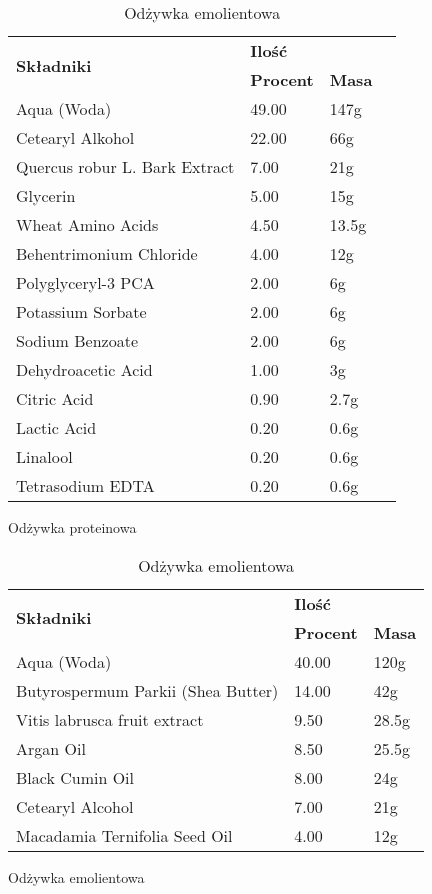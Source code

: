 \begin{table}[H]
\begin{footnotesize}
	\begin{subfigure}[t]{0.45\textwidth}
		\centering
		\caption{Odżywka proteinowa}
		\begin{tabular}{p{}lll}
			\hline
			\multirow{2}{*}{\textbf{Składniki}} & \multicolumn{2}{l}{\textbf{Ilość}} \\
			\cline{2-3}
			& \textbf{Procent} & \textbf{Masa} \\
			\hline\hline
			Aqua (Woda)  & 49.00 & 147g \\
			Cetearyl Alkohol  & 22.00 & 66g \\
			Quercus robur L. Bark Extract   & 7.00 & 21g \\
			Glycerin  & 5.00 & 15g \\
			Wheat Amino Acids   & 4.50 & 13.5g \\
			Behentrimonium Chloride  & 4.00 & 12g \\
			Polyglyceryl-3 PCA  & 2.00 & 6g \\
			Potassium Sorbate  & 2.00 & 6g \\
			Sodium Benzoate  & 2.00 & 6g \\
			Dehydroacetic Acid  & 1.00 & 3g \\
			Citric Acid  & 0.90 & 2.7g \\
			Lactic Acid  & 0.20 & 0.6g \\
			Linalool & 0.20 & 0.6g \\
			Tetrasodium EDTA  & 0.20 & 0.6g \\
			\hline
		\end{tabular}
	\end{subfigure}
	\begin{subfigure}[t]{0.5\textwidth}
		\centering
		\caption{Odżywka emolientowa}
		\begin{tabular}{p{}ll}
			\hline
			\multirow{2}{*}{\textbf{Składniki}} & \multicolumn{2}{l}{\textbf{Ilość}} \\
			\cline{2-3}
			& \textbf{Procent} & \textbf{Masa} \\
				\hline\hline
				Aqua (Woda) & 40.00 & 120g \\
				Butyrospermum Parkii (Shea Butter) & 14.00 & 42g \\
				Vitis labrusca fruit extract & 9.50 & 28.5g \\
				Argan Oil & 8.50 & 25.5g \\
				Black Cumin Oil & 8.00 & 24g \\
				Cetearyl Alcohol & 7.00 & 21g \\
				Macadamia Ternifolia Seed Oil & 4.00 & 12g \\

\end{tabular}
\end{subfigure}
\end{footnotesize}
\end{table}
